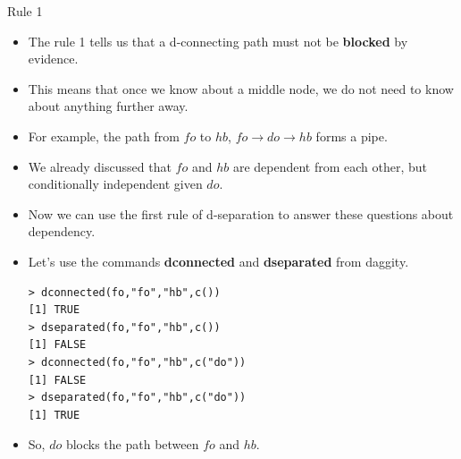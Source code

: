 \documentclass[handout]{beamer}
\begin{document}
\begin{frame}[fragile]{Rule 1}
\scriptsize{
\begin{itemize}

\item The rule 1 tells us that a d-connecting path must not be \textbf{blocked} by evidence.

\item This means that once we know about a middle node, we do not need to know about anything further away.

\item For example, the path from $fo$ to $hb$, $fo \rightarrow do \rightarrow hb$ forms a pipe.

\item We already discussed that $fo$ and $hb$ are dependent from each other, but conditionally independent given $do$.

\item Now we can use the first rule of d-separation to answer these questions about dependency.

\item Let's use the commands \textbf{dconnected} and \textbf{dseparated} from daggity.

\begin{verbatim}
> dconnected(fo,"fo","hb",c()) 
[1] TRUE
> dseparated(fo,"fo","hb",c()) 
[1] FALSE
> dconnected(fo,"fo","hb",c("do")) 
[1] FALSE
> dseparated(fo,"fo","hb",c("do")) 
[1] TRUE
\end{verbatim}

\item So, $do$ blocks the path between $fo$ and $hb$.




\end{itemize}

} 

\end{frame}
\end{document}
